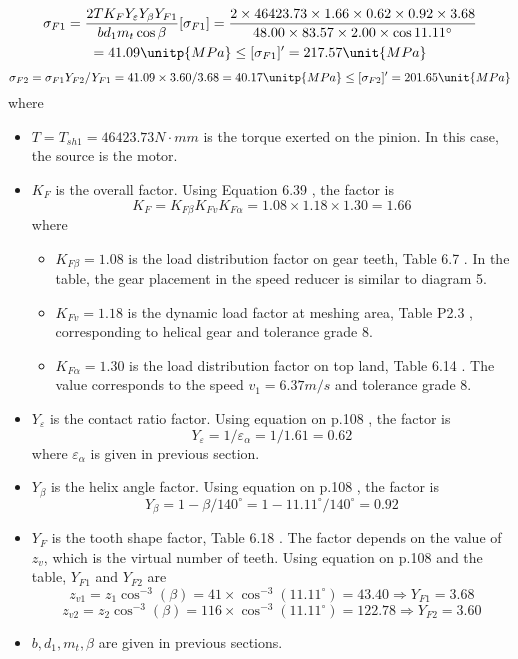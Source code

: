 \begin{multline*}
	\sigma_{F1} = \dfrac{2TK_FY_\varepsilon Y_\beta Y_{F1}}{bd_1m_t\cos\beta} [\sigma_{F1}]= \dfrac{2\times 46423.73 \times 1.66 \times 0.62 \times 0.92 \times 3.68}{48.00 \times 83.57 \times 2.00 \times\cos 11.11^\circ}\\
	= 41.09 \unitp{MPa} \leq [\sigma_{F1}]' = 217.57 \unit{MPa}
\end{multline*}
\[\sigma_{F2} = \sigma_{F1}Y_{F2}/Y_{F1} = {41.09 \times 3.60}/3.68 = 40.17 \unitp{MPa} \leq [\sigma_{F2}]' = 201.65 \unit{MPa}\]
where
\begin{itemize}
	\item $ T=T_{sh1}=46423.73\unit{N\cdot mm} $ is the torque exerted on the pinion. In this case, the source is the motor.
	\item $ K_F $ is the overall factor. Using Equation 6.39 \cite{tk1}, the factor is
	\[ K_F = K_{F\beta}K_{Fv}K_{F\alpha} = 1.08 \times 1.18 \times 1.30 = 1.66 \]
	where
	\begin{itemize}
		\item $ K_{F\beta} = 1.08 $ is the load distribution factor on gear teeth, Table 6.7 \cite{tk1}. In the table, the gear placement in the speed reducer is similar to diagram 5.
		\item $ K_{Fv} = 1.18 $ is the dynamic load factor at meshing area, Table P2.3 \cite{tk1}, corresponding to helical gear and tolerance grade 8.
		\item $ K_{F\alpha} = 1.30 $ is the load distribution factor on top land, Table 6.14 \cite{tk1}. The value corresponds to the speed $ v_1=6.37 \unit{m/s} $ and tolerance grade 8.
	\end{itemize}
	\item $ Y_\varepsilon $ is the contact ratio factor. Using equation on p.108 \cite{tk1}, the factor is
	\[ Y_\varepsilon = 1/\varepsilon_\alpha = 1/1.61 = 0.62 \]
	where $ \varepsilon_\alpha $ is given in previous section.
	\item $ Y_\beta $ is the helix angle factor. Using equation on p.108 \cite{tk1}, the factor is
	\[ Y_\beta = 1-{\beta}/{140^\circ}=  1-{11.11^\circ}/{140^\circ}= 0.92 \]
	\item $ Y_F $ is the tooth shape factor, Table 6.18 \cite{tk1}. The factor depends on the value of $ z_v $, which is the virtual number of teeth. Using equation on p.108 \cite{tk1} and the table, $ Y_{F1} $ and $ Y_{F2} $ are
	\[ z_{v1} = z_1\cos^{-3}(\beta) = 41\times\cos^{-3}(11.11^\circ) = 43.40\Rightarrow Y_{F1} = 3.68\]
	\[ z_{v2} = z_2\cos^{-3}(\beta) = 116\times\cos^{-3}(11.11^\circ) = 122.78\Rightarrow Y_{F2} = 3.60\]
	\item $ b,d_1,m_t,\beta $ are given in previous sections.
\end{itemize}
%
%


